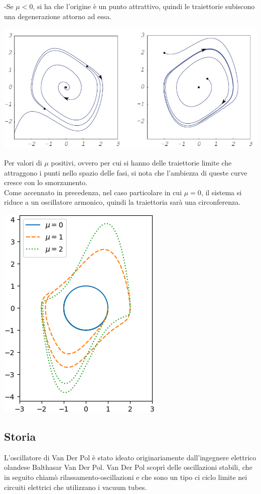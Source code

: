 \documentclass[12pt]{article}
\begin{document}
-Se $\mu<0$, si ha che l'origine è un punto attrattivo, quindi le traiettorie subiscono una degenerazione attorno ad essa. \\
\begin{center}
	\includegraphics[scale=0.7]{Traiettorie}
\end{center}
Per valori di $\mu$ positivi, ovvero per cui si hanno delle traiettorie limite che attraggono i punti nello spazio delle fasi, si nota che l'ambiezza di queste curve cresce con lo smorzamento. \\
Come accennato in precedenza, nel caso particolare in cui $\mu = 0$, il sistema si riduce a un oscillatore armonico, quindi la traiettoria sarà una circonferenza.
\begin{center}
	\includegraphics[scale=1]{Vari smorzamenti} 
\end{center}
\subsection{Storia}
L'oscillatore di Van Der Pol è stato ideato originariamente dall'ingegnere elettrico olandese Balthasar Van Der Pol. Van Der Pol scoprì delle oscillazioni stabili, che in seguito chiamò rilassamento-oscillazioni e che sono un tipo ci ciclo limite nei circuiti elettrici che utilizzano i vacuum tubes. \\
\end{document}

